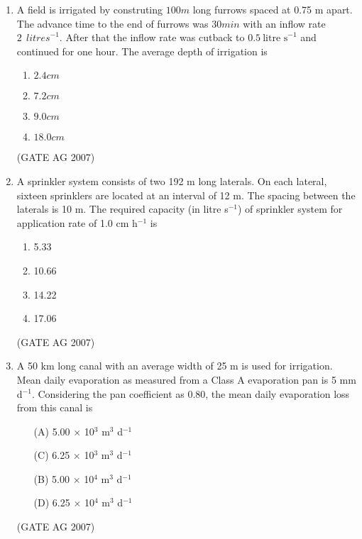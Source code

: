 \documentclass[journal,12pt,onecolumn]{IEEEtran}
\theoremstyle{remark}
\begin{document}
\begin{enumerate}[label=Q\arabic*:]
\item A field is irrigated by construting $100 m$ long furrows spaced at 0.75 m apart. The advance time to the end of furrows was $30 min$ with an inflow rate $2\ \ {litre s}^{-1}$. After that the inflow rate was cutback to  $0.5\ \text{litre s}^{-1}$ and continued for one hour. The average depth of irrigation is 
\begin{multicols}{4}
    \begin{enumerate}
        \item $2.4 cm$
        \item $7.2 cm$
        \item $9.0 cm$
        \item $18.0 cm$
    \end{enumerate}
\end{multicols}
\hfill(GATE AG 2007)

\item  A sprinkler system consists of two 192 m long laterals. On each lateral, sixteen sprinklers are located at an interval of 12 m. The spacing between the laterals is 10 m. The required capacity (in litre s$^{-1}$) of sprinkler system for application rate of 1.0 cm h$^{-1}$ is
\begin{multicols}{4}
\begin{enumerate}
    \item 5.33
    \item 10.66
    \item 14.22
    \item 17.06
\end{enumerate}
\end{multicols}
\hfill(GATE AG 2007)

\item  A 50 km long canal with an average width of 25 m is used for irrigation. Mean daily evaporation as measured from a Class A evaporation pan is 5 mm d$^{-1}$. Considering the pan coefficient as 0.80, the mean daily evaporation loss from this canal is
\begin{multicols}{2}
\begin{enumerate}
    \item[(A)] 5.00 $\times$ 10$^{3}$ m$^{3}$ d$^{-1}$
    \item[(C)] 6.25 $\times$ 10$^{3}$ m$^{3}$ d$^{-1}$
    \item[(B)] 5.00 $\times$ 10$^{4}$ m$^{3}$ d$^{-1}$
    \item[(D)] 6.25 $\times$ 10$^{4}$ m$^{3}$ d$^{-1}$
\end{enumerate}
\end{multicols}
\hfill(GATE AG 2007)


\end{enumerate}
\end{document}
